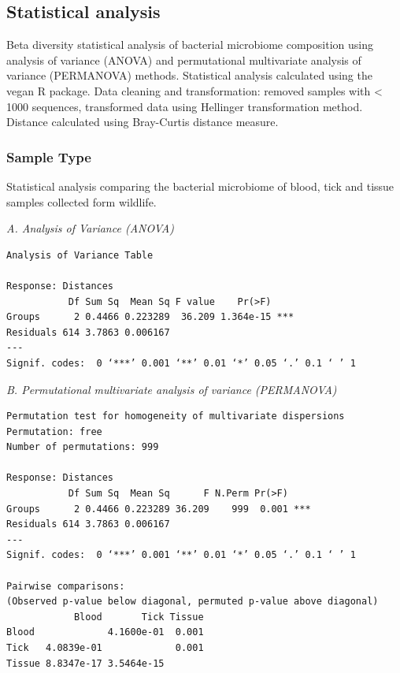 \documentclass[a4paper, nobind]{templates/ociamthesis}
\begin{document}
\clearpage

\hypertarget{ch3stats}{%
\subsection{Statistical analysis}\label{ch3stats}}

Beta diversity statistical analysis of bacterial microbiome composition using analysis of variance (ANOVA) and permutational multivariate analysis of variance (PERMANOVA) methods.
Statistical analysis calculated using the vegan R package.
Data cleaning and transformation: removed samples with \textless{} 1000 sequences, transformed data using Hellinger transformation method. Distance calculated using Bray-Curtis distance measure.

\hypertarget{ch3stats1}{%
\subsubsection{Sample Type}\label{ch3stats1}}

Statistical analysis comparing the bacterial microbiome of blood, tick and tissue samples collected form wildlife.

\emph{A. Analysis of Variance (ANOVA)}

\begin{verbatim}
Analysis of Variance Table

Response: Distances
           Df Sum Sq  Mean Sq F value    Pr(>F)    
Groups      2 0.4466 0.223289  36.209 1.364e-15 ***
Residuals 614 3.7863 0.006167                      
---
Signif. codes:  0 ‘***’ 0.001 ‘**’ 0.01 ‘*’ 0.05 ‘.’ 0.1 ‘ ’ 1
\end{verbatim}

\emph{B. Permutational multivariate analysis of variance (PERMANOVA)}

\begin{verbatim}
Permutation test for homogeneity of multivariate dispersions
Permutation: free
Number of permutations: 999

Response: Distances
           Df Sum Sq  Mean Sq      F N.Perm Pr(>F)    
Groups      2 0.4466 0.223289 36.209    999  0.001 ***
Residuals 614 3.7863 0.006167                         
---
Signif. codes:  0 ‘***’ 0.001 ‘**’ 0.01 ‘*’ 0.05 ‘.’ 0.1 ‘ ’ 1

Pairwise comparisons:
(Observed p-value below diagonal, permuted p-value above diagonal)
            Blood       Tick Tissue
Blood             4.1600e-01  0.001
Tick   4.0839e-01             0.001
Tissue 8.8347e-17 3.5464e-15       
\end{verbatim}
\end{document}

